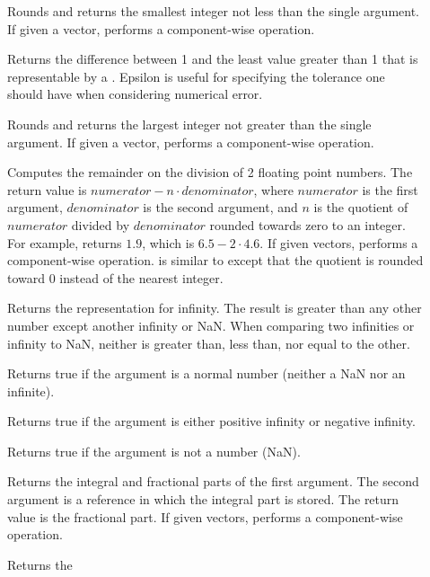 \begin{description}
\item[]   Rounds
  and returns the smallest integer not less than the single argument. If
  given a vector, performs a component-wise operation.
\item[] Returns the difference between 1 and the least
  value greater than 1 that is representable by a . Epsilon is
  useful for specifying the tolerance one should have when considering
  numerical error.
\item[]   Rounds
  and returns the largest integer not greater than the single argument. If
  given a vector, performs a component-wise operation.
\item[]  Computes the remainder on the
  division of 2 floating point numbers. The return value is $numerator - n
  \cdot denominator$, where $numerator$ is the first argument,
  $denominator$ is the second argument, and $n$ is the quotient of
  $numerator$ divided by $denominator$ rounded towards zero to an
  integer. For example,  returns
  $1.9$, which is $6.5 - 2\cdot4.6$. If given vectors,
   performs a component-wise
  operation.  is similar to 
  except that the quotient is rounded toward 0 instead of the nearest
  integer.
\item[] Returns the  representation for
  infinity. The result is greater than any other number except another
  infinity or NaN. When comparing two infinities or infinity to NaN,
  neither is greater than, less than, nor equal to the other.
\item[] Returns true if the argument is a normal number
  (neither a NaN nor an infinite).
\item[] Returns true if the argument is either positive
  infinity or negative infinity.
\item[] Returns true if the argument is not a number (NaN).
\item[] Returns the integral and fractional parts of the
  first argument. The second argument is a reference in which the integral
  part is stored. The return value is the fractional part. If given
  vectors,  performs a component-wise operation.
\item[]  Returns the 

\end{description}
